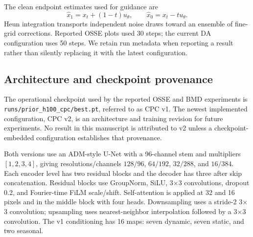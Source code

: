 \documentclass[10pt,twocolumn]{article}
\begin{document}
The clean endpoint estimates used for guidance are
\begin{equation}
 \widehat{x}_1=x_t+(1-t)u_\theta,\qquad
 \widehat{x}_0=x_t-tu_\theta.
 \label{eq:endpoints}
\end{equation}
Heun integration transports independent noise draws toward an ensemble of fine-grid corrections. Reported OSSE plots used 30 steps; the current DA configuration uses 50 steps. We retain run metadata when reporting a result rather than silently replacing it with the latest configuration.

\subsection{Architecture and checkpoint provenance}

The operational checkpoint used by the reported OSSE and BMD experiments is \texttt{runs/prior\_h100\_cpc/best.pt}, referred to as CPC v1. The newest implemented configuration, CPC v2, is an architecture and training revision for future experiments. No result in this manuscript is attributed to v2 unless a checkpoint-embedded configuration establishes that provenance.

Both versions use an ADM-style U-Net with a 96-channel stem and multipliers $[1,2,3,4]$, giving resolutions/channels $128/96$, $64/192$, $32/288$, and $16/384$. Each encoder level has two residual blocks and the decoder has three after skip concatenation. Residual blocks use GroupNorm, SiLU, 3$\times$3 convolutions, dropout 0.2, and Fourier-time FiLM scale/shift. Self-attention is applied at 32 and 16 pixels and in the middle block with four heads. Downsampling uses a stride-2 3$\times$3 convolution; upsampling uses nearest-neighbor interpolation followed by a 3$\times$3 convolution. The v1 conditioning has 16 maps: seven dynamic, seven static, and two seasonal.
\end{document}
